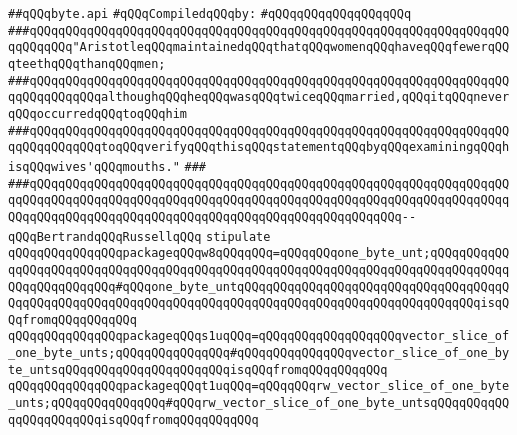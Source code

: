 \label{src/lib/std/src/byte.api}
\verb|##qQQqbyte.api|\newline
\newline
\verb|#qQQqCompiledqQQqby:|\newline
\verb|#qQQqqQQqqQQqqQQqqQQq|\newline
\newline
\newline
\newline
\verb|###qQQqqQQqqQQqqQQqqQQqqQQqqQQqqQQqqQQqqQQqqQQqqQQqqQQqqQQqqQQqqQQqqQQqqQQqqQQq"AristotleqQQqmaintainedqQQqthatqQQqwomenqQQqhaveqQQqfewerqQQqteethqQQqthanqQQqmen;|\newline
\verb|###qQQqqQQqqQQqqQQqqQQqqQQqqQQqqQQqqQQqqQQqqQQqqQQqqQQqqQQqqQQqqQQqqQQqqQQqqQQqqQQqalthoughqQQqheqQQqwasqQQqtwiceqQQqmarried,qQQqitqQQqneverqQQqoccurredqQQqtoqQQqhim|\newline
\verb|###qQQqqQQqqQQqqQQqqQQqqQQqqQQqqQQqqQQqqQQqqQQqqQQqqQQqqQQqqQQqqQQqqQQqqQQqqQQqqQQqtoqQQqverifyqQQqthisqQQqstatementqQQqbyqQQqexaminingqQQqhisqQQqwives'qQQqmouths."|\newline
\verb|###|\newline
\verb|###qQQqqQQqqQQqqQQqqQQqqQQqqQQqqQQqqQQqqQQqqQQqqQQqqQQqqQQqqQQqqQQqqQQqqQQqqQQqqQQqqQQqqQQqqQQqqQQqqQQqqQQqqQQqqQQqqQQqqQQqqQQqqQQqqQQqqQQqqQQqqQQqqQQqqQQqqQQqqQQqqQQqqQQqqQQqqQQqqQQqqQQqqQQqqQQq--qQQqBertrandqQQqRussellqQQq|\newline
\newline
\newline
\verb|stipulate|\newline
\verb|qQQqqQQqqQQqqQQqpackageqQQqw8qQQqqQQq=qQQqqQQqone_byte_unt;qQQqqQQqqQQqqQQqqQQqqQQqqQQqqQQqqQQqqQQqqQQqqQQqqQQqqQQqqQQqqQQqqQQqqQQqqQQqqQQqqQQqqQQqqQQqqQQq#qQQqone_byte_untqQQqqQQqqQQqqQQqqQQqqQQqqQQqqQQqqQQqqQQqqQQqqQQqqQQqqQQqqQQqqQQqqQQqqQQqqQQqqQQqqQQqqQQqqQQqqQQqqQQqqQQqisqQQqfromqQQqqQQqqQQq|\newline
\verb|qQQqqQQqqQQqqQQqpackageqQQqs1uqQQq=qQQqqQQqqQQqqQQqqQQqvector_slice_of_one_byte_unts;qQQqqQQqqQQqqQQq#qQQqqQQqqQQqqQQqvector_slice_of_one_byte_untsqQQqqQQqqQQqqQQqqQQqqQQqisqQQqfromqQQqqQQqqQQq|\newline
\verb|qQQqqQQqqQQqqQQqpackageqQQqt1uqQQq=qQQqqQQqrw_vector_slice_of_one_byte_unts;qQQqqQQqqQQqqQQq#qQQqrw_vector_slice_of_one_byte_untsqQQqqQQqqQQqqQQqqQQqqQQqisqQQqfromqQQqqQQqqQQq|\newline
